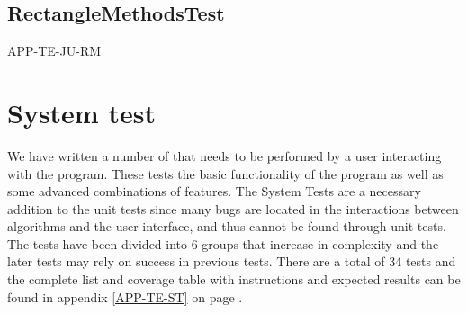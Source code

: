 \subsection{RectangleMethodsTest}
\label{TEST-JU-RMT}
APP-TE-JU-RM

\section{System test}
\label{TEST-ST}
We have written a number of  that needs to be performed by a
user interacting with the program. These tests the basic functionality of the
program as well as some advanced combinations of features. The System Tests are
a necessary addition to the unit tests since many bugs are located in the
interactions between algorithms and the user interface, and thus cannot be found
through unit tests. The tests have been divided into 6 groups that increase in
complexity and the later tests may rely on success in previous tests. There are
a total of 34 tests and the complete list and coverage table with instructions
and expected results can be found in appendix \ref{APP-TE-ST} on page
\pageref{APP-TE-ST}.
